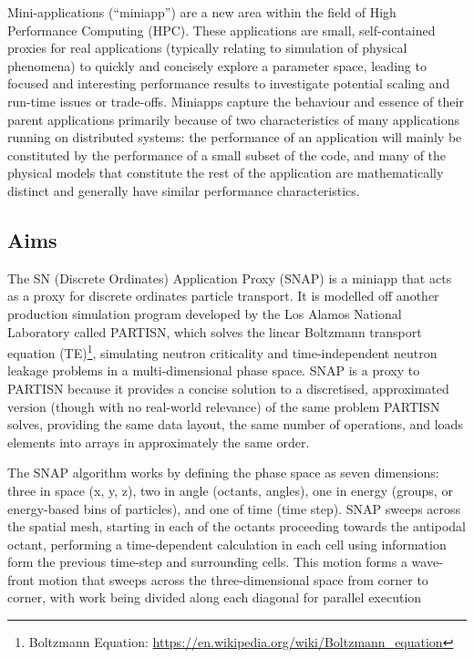 \documentclass[conference]{IEEEtran}
\begin{document}
Mini-applications (``miniapp”) are a new area within the field of High Performance Computing (HPC). These applications are small, self-contained proxies for real applications (typically relating to simulation of physical phenomena) to quickly and concisely explore a parameter space, leading to focused and interesting performance results to investigate potential scaling and run-time issues or trade-offs\cite{miniapps}. Miniapps capture the behaviour and essence of their parent applications primarily because of two characteristics of many applications running on distributed systems: the performance of an application will mainly be constituted by the performance of a small subset of the code, and many of the physical models that constitute the rest of the application are mathematically distinct and generally have similar performance characteristics\cite{miniapps}.

\subsection{Aims}

The SN (Discrete Ordinates) Application Proxy (SNAP) is a miniapp that acts as a proxy for discrete ordinates particle transport. It is modelled off another production simulation program developed by the Los Alamos National Laboratory called PARTISN, which solves the linear Boltzmann transport equation (TE)\footnote{Boltzmann Equation: \url{ https://en.wikipedia.org/wiki/Boltzmann_equation}}, simulating neutron criticality and time-independent neutron leakage problems\cite{partisn} in a multi-dimensional phase space. SNAP is a proxy to PARTISN because it provides a concise solution to a discretised, approximated version (though with no real-world relevance) of the same problem PARTISN solves, providing the same data layout, the same number of operations, and loads elements into arrays in approximately the same order.

The SNAP algorithm works by defining the phase space as seven dimensions: three in space (x, y, z), two in angle (octants, angles), one in energy (groups, or energy-based bins of particles), and one of time (time step). SNAP sweeps across the spatial mesh, starting in each of the octants proceeding towards the antipodal octant, performing a time-dependent calculation in each cell using information form the previous time-step and surrounding cells. This motion forms a wave-front motion that sweeps across the three-dimensional space from corner to corner, with work being divided along each diagonal for parallel execution
\end{document}
